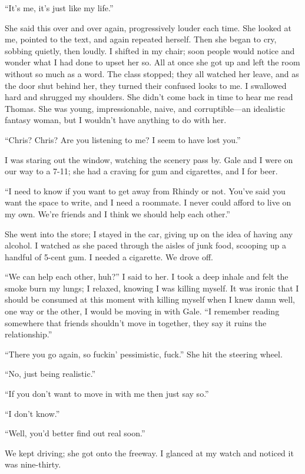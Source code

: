 ``It's me, it's just like my life.''

She said this over and over again, progressively louder each time. She
looked at me, pointed to the text, and again repeated herself. Then she
began to cry, sobbing quietly, then loudly. I shifted in my chair; soon
people would notice and wonder what I had done to upset her so. All at
once she got up and left the room without so much as a word. The class
stopped; they all watched her leave, and as the door shut behind her,
they turned their confused looks to me. I swallowed hard and shrugged my
shoulders. She didn't come back in time to hear me read Thomas. She was
young, impressionable, naive, and corruptible---an idealistic fantasy
woman, but I wouldn't have anything to do with her.

``Chris? Chris? Are you listening to me? I seem to have lost you.''

I was staring out the window, watching the scenery pass by. Gale and I
were on our way to a 7-11; she had a craving for gum and cigarettes, and
I for beer.

``I need to know if you want to get away from Rhindy or not. You've said
you want the space to write, and I need a roommate. I never could afford
to live on my own. We're friends and I think we should help each
other.''

She went into the store; I stayed in the car, giving up on the idea of
having any alcohol. I watched as she paced through the aisles of junk
food, scooping up a handful of 5-cent gum. I needed a cigarette. We
drove off.

``We can help each other, huh?'' I said to her. I took a deep inhale and
felt the smoke burn my lungs; I relaxed, knowing I was killing myself.
It was ironic that I should be consumed at this moment with killing
myself when I knew damn well, one way or the other, I would be moving in
with Gale. ``I remember reading somewhere that friends shouldn't move in
together, they say it ruins the relationship.''

``There you go again, so fuckin' pessimistic, fuck.'' She hit the
steering wheel.

``No, just being realistic.''

``If you don't want to move in with me then just say so.''

``I don't know.''

``Well, you'd better find out real soon.''

We kept driving; she got onto the freeway. I glanced at my watch and
noticed it was nine-thirty.

